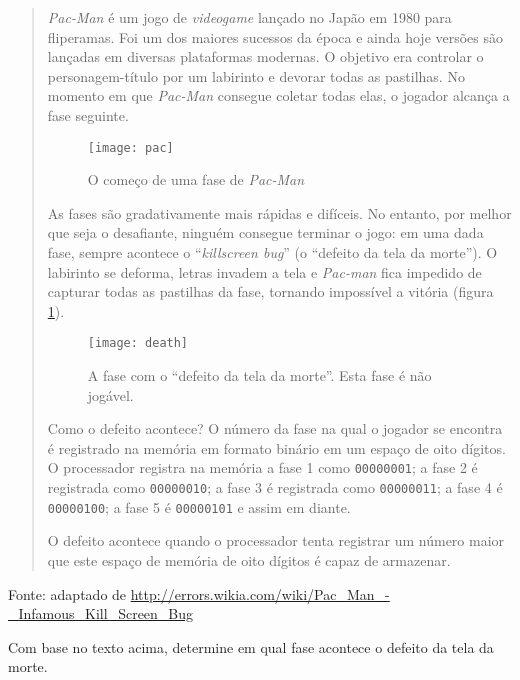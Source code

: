 \begin{ex}
\begin{quote}

\emph{Pac-Man} é um jogo de \emph{videogame} lançado no Japão em 1980 para fliperamas. Foi um dos maiores sucessos da época e ainda hoje versões são lançadas em diversas plataformas modernas. 
O objetivo era controlar o personagem-título por um labirinto e devorar todas as pastilhas. No momento em que \emph{Pac-Man} consegue coletar todas elas, o jogador alcança a fase seguinte. 

\begin{figure}[h!b]
\center
\texttt{[image: pac]}
\caption{O começo de uma fase de \emph{Pac-Man}}
\end{figure}

As fases são gradativamente mais rápidas e difíceis. No entanto, por melhor que seja o desafiante, ninguém consegue terminar o jogo: em uma dada fase, sempre acontece o ``\emph{killscreen bug}'' (o ``defeito da tela da morte''). O labirinto se deforma, letras invadem a tela e \emph{Pac-man} fica impedido de capturar todas as pastilhas da fase, tornando impossível a vitória (figura \ref{ch.erro.death}).

\begin{figure}[h!b]
\center
\texttt{[image: death]}
\caption{A fase com o “defeito da tela da morte”. Esta fase é não jogável.}\label{ch.erro.death}
\end{figure}


Como o defeito acontece? O número da fase na qual o jogador se encontra é registrado na memória em formato binário em um espaço de oito dígitos. O processador registra na memória a fase 1 como \texttt{00000001}; a fase 2 é registrada como \texttt{00000010}; a fase 3 é registrada como \texttt{00000011}; a fase 4 é \texttt{00000100}; a fase 5 é \texttt{00000101} e assim em diante.


O defeito acontece quando o processador tenta registrar um número maior que este espaço de memória de oito dígitos é capaz de armazenar.\end{quote}
Fonte: adaptado de \url{http://errors.wikia.com/wiki/Pac_Man_-_Infamous_Kill_Screen_Bug} 

Com base no texto acima, determine em qual fase acontece o defeito da tela da morte.
\end{ex}
